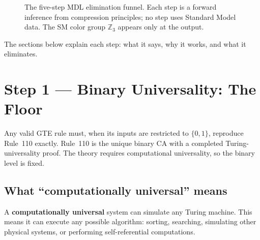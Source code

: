 \documentclass[11pt,a4paper]{article}
\newcommand{\term}[1]{\textbf{#1}}
\theoremstyle{definition}
\begin{document}
\begin{figure}[htbp]
\caption{The five-step MDL elimination funnel. Each step is a forward
inference from compression principles; no step uses Standard Model data.
The SM color group $\mathbb{Z}_3$ appears only at the output.}
\label{fig:funnel}
\end{figure}

\bigskip
The sections below explain each step: what it says, why it works, and what
it eliminates.

\section{Step 1 — Binary Universality: The Floor}
\label{sec:step1}

\begin{tcolorbox}[colback=boxblue,colframe=blue!40!black,
  title={Step~1 claim}]
Any valid GTE rule must, when its inputs are restricted to $\{0, 1\}$,
reproduce Rule~110 exactly.  Rule~110 is the unique binary CA with a
completed Turing-universality proof.  The theory requires computational
universality, so the binary level is fixed.
\end{tcolorbox}

\subsection{What ``computationally universal'' means}

A \term{computationally universal} system can simulate any Turing machine.
This means it can execute any possible algorithm: sorting, searching,
simulating other physical systems, or performing self-referential
computations.
\end{document}
